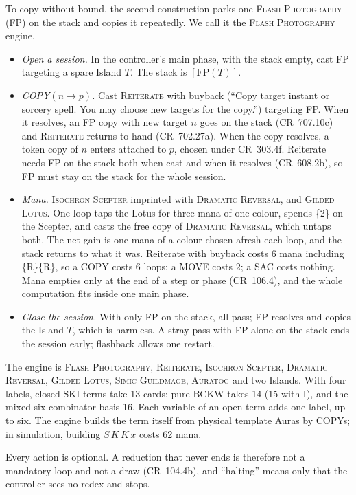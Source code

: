 \documentclass[11pt]{article}
\theoremstyle{definition}
\newcommand{\ms}[1]{\{#1\}}
\newcommand{\card}[1]{{\mdseries\scshape #1}}
\newcommand{\CR}[1]{CR~#1}
\newcommand{\mv}{\to}
\begin{document}
To copy without bound, the second construction parks one \card{Flash Photography} (FP) on
the stack and copies it repeatedly. We call it the \card{Flash Photography} engine.
\begin{itemize}[nosep,leftmargin=*]
\item \emph{Open a session.} In the controller's main phase, with the stack empty, cast FP
  targeting a spare Island $T$. The stack is $[\mathrm{FP}(T)]$.
\item \emph{COPY$(n\mv p)$.} Cast \card{Reiterate} with buyback (``Copy target instant or
  sorcery spell. You may choose new targets for the copy.'') targeting FP. When it resolves,
  an FP copy with new target $n$ goes on the stack (\CR{707.10c}) and \card{Reiterate}
  returns to hand (\CR{702.27a}). When the copy resolves, a token copy of $n$ enters
  attached to $p$, chosen under \CR{303.4f}. Reiterate needs FP on the stack both when cast
  and when it resolves (\CR{608.2b}), so FP must stay on the stack for the whole session.
\item \emph{Mana.} \card{Isochron Scepter} imprinted with \card{Dramatic Reversal}, and
  \card{Gilded Lotus}. One loop taps the Lotus for three mana of one colour, spends \ms{2}
  on the Scepter, and casts the free copy of \card{Dramatic Reversal}, which untaps both.
  The net gain is one mana of a colour chosen afresh each loop, and the stack returns to
  what it was. Reiterate with buyback costs 6 mana including \ms{R}\ms{R}, so a COPY
  costs 6 loops; a MOVE costs 2; a SAC costs nothing. Mana empties only at the end of a step
  or phase (\CR{106.4}), and the whole computation fits inside one main phase.
\item \emph{Close the session.} With only FP on the stack, all pass; FP resolves and copies
  the Island $T$, which is harmless. A stray pass with FP alone on the stack ends the
  session early; flashback allows one restart.
\end{itemize}

The engine is \card{Flash Photography}, \card{Reiterate}, \card{Isochron Scepter},
\card{Dramatic Reversal}, \card{Gilded Lotus}, \card{Simic Guildmage}, \card{Auratog} and two
Islands. With four labels, closed SKI terms take 13 cards; pure BCKW takes 14 (15 with
I), and the mixed six-combinator basis 16. Each variable of an open term adds one label,
up to six. The engine builds the term itself from physical template Auras by COPYs; in
simulation, building $S\,K\,K\,x$ costs 62 mana.

Every action is optional. A reduction that never ends is therefore not a mandatory loop
and not a draw (\CR{104.4b}), and ``halting'' means only that the controller sees no redex
and stops.
\end{document}

